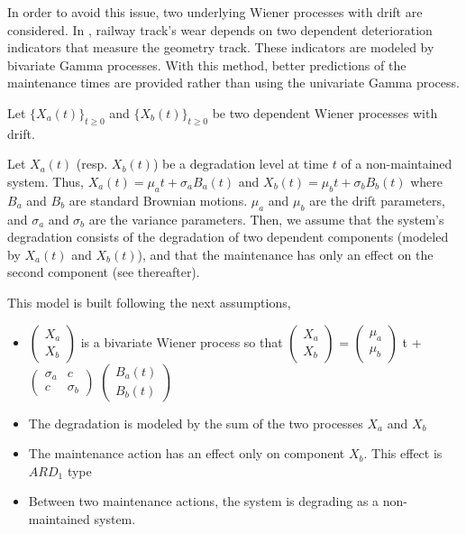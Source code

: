 \noindent In order to avoid this issue, two underlying Wiener processes with drift are considered. In \cite{mercier_bivariate_2012}, railway track's wear depends on  two dependent deterioration indicators that measure the geometry track. These indicators are modeled by bivariate Gamma processes. With this method, better predictions of the maintenance times are provided rather than using the  univariate Gamma process.

\noindent Let $\{X_a(t)\}_{t \geq0 }$ and $\{X_b(t)\}_{t \geq0 }$ be two dependent Wiener processes with drift.

\noindent Let $X_a(t)$ (resp. $X_b(t)$) be a degradation level at time $t$ of a non-maintained system. Thus, $ X_a(t)= \mu_a t + \sigma_a B_a(t)$ and $X_b(t)= \mu_b t + \sigma_b B_b(t)$ where $B_a$ and $B_b$ are standard Brownian motions. $\mu_a$ and $\mu_b$ are the drift parameters, and $\sigma_a$ and $\sigma_b$ are the variance parameters. 
Then, we assume that the system's degradation consists of the degradation of two dependent components (modeled by  $X_a(t)$ and $X_b(t)$), and that the maintenance has only an effect on the second component (see thereafter). 

\noindent This model is built following the next assumptions,

\begin{itemize}
\item
 $\begin{pmatrix}
X_a \\
X_b
\end{pmatrix} $
is a bivariate Wiener process so that $\begin{pmatrix}
X_a \\
X_b
\end{pmatrix} $ =  $\begin{pmatrix}
\mu_a \\
\mu_b
\end{pmatrix} $ t +  $\begin{pmatrix}
\sigma_a & c\\
c & \sigma_b
\end{pmatrix} $  $\begin{pmatrix}
B_a(t) \\
B_b(t)
\end{pmatrix} $ 
\item The degradation is modeled by the sum of the two processes $X_a$ and $X_b$ 
\item The maintenance action has an effect only on component $X_b$. This effect is $ARD_1$ type \cite{mercier_stochastic_2019}
\item Between  two maintenance actions, the system is degrading  as a non-maintained system.
\end{itemize}
 




